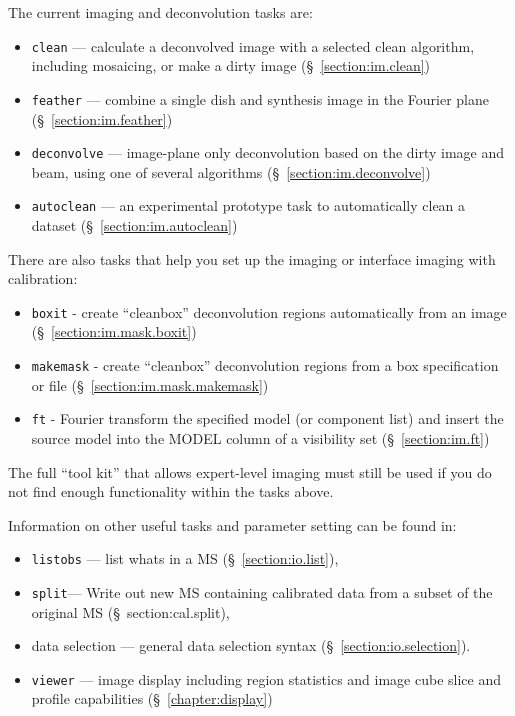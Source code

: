 The current imaging and deconvolution tasks are:
\begin{itemize}
   \item {\tt clean} --- calculate a deconvolved image with a selected clean
         algorithm, including mosaicing, or make a dirty image
         (\S~\ref{section:im.clean})
   \item {\tt feather} --- combine a single dish and synthesis image in the
         Fourier plane (\S~\ref{section:im.feather})
   \item {\tt deconvolve} --- image-plane only deconvolution based on
         the dirty image and beam, using one of several algorithms
         (\S~\ref{section:im.deconvolve})
   \item {\tt autoclean} --- an experimental prototype task to
         automatically clean a dataset
         (\S~\ref{section:im.autoclean})
\end{itemize}

There are also tasks that help you set up the imaging or interface
imaging with calibration:

\begin{itemize}
   \item {\tt boxit} - create ``cleanbox'' deconvolution regions automatically
         from an image (\S~\ref{section:im.mask.boxit})
   \item {\tt makemask} - create ``cleanbox'' deconvolution regions
         from a box specification or file (\S~\ref{section:im.mask.makemask})
   \item {\tt ft} - Fourier transform the specified model (or component
         list) and insert the source model into the MODEL column of a
         visibility set (\S~\ref{section:im.ft})
\end{itemize}

The full ``tool kit'' that allows expert-level imaging must still be
used if you do not find enough functionality within the tasks above. 

Information on other useful tasks and parameter setting can be found in:
\begin{itemize}
   \item {\tt listobs} --- list whats in a MS (\S~\ref{section:io.list}),
   \item {\tt split}--- Write out new MS containing calibrated data
      from a subset of the original MS (\S~{section:cal.split}),
   \item data selection --- general data selection syntax
      (\S~\ref{section:io.selection}).
   \item {\tt viewer} --- image display including region statistics and
         image cube slice and profile capabilities
         (\S~\ref{chapter:display})
\end{itemize}

